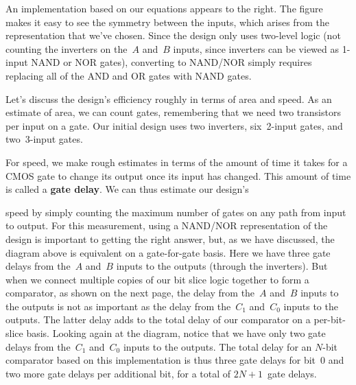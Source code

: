 \begin{minipage}{3.45in}
An implementation based on our equations appears to the right.  
The figure makes it easy to see the symmetry between the inputs, which
arises from the representation that we've chosen.  Since the design
only uses two-level logic (not counting the inverters on the~$A$
and~$B$ inputs, since inverters can be viewed as \mbox{1-input} 
NAND or NOR gates), converting to NAND/NOR simply requires replacing
all of the AND and OR gates with NAND gates.\mpline

Let's discuss the design's efficiency roughly in terms of area and speed.
As an estimate of area, we can count gates, remembering that we need
two transistors per input on a gate.
%
Our initial design uses two inverters, six~\mbox{2-input} gates, and 
two~\mbox{3-input} gates.\mpline

For speed, we make rough estimates in terms of the amount of time
it takes for a CMOS gate to change its output once its input has changed.
This amount of time is called a {\bf gate delay}.  
%
We can thus estimate our design's\linebreak
\end{minipage}\hspace{.25in}%
\begin{minipage}{2.8in}
\vspace{12pt}
\end{minipage}\mpdone

speed by simply counting the maximum number of gates on any path
from input to output.  For this measurement, using a NAND/NOR 
representation of the design is important to getting the right answer,
but, as we have discussed, the diagram above is equivalent on a 
gate-for-gate basis.  Here we have three gate delays from the~$A$ 
and~$B$ inputs to the outputs (through the inverters).
%
But when we connect multiple copies of our bit slice logic together to 
form a comparator, as shown on the next page, the delay from 
the~$A$ and~$B$ inputs
to the outputs is not as important as the delay from the~$C_1$ and~$C_0$ 
inputs to the outputs.  The latter delay adds to the total delay of
our comparator on a per-bit-slice basis.  Looking again at the diagram, 
notice that we have only two gate delays from the~$C_1$ and~$C_0$ inputs 
to the
outputs.  The total delay for an \mbox{$N$-bit} comparator based on this
implementation is thus three gate delays for bit~0 and two more gate
delays per additional bit, for a total of $2N+1$~gate delays.\\

